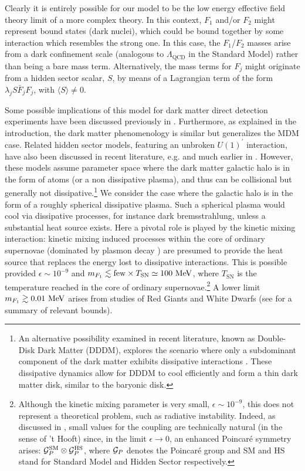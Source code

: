 \documentclass[12pt]{article}
\begin{document}
Clearly it is entirely possible for our model to be the low energy effective field theory limit of a more complex theory. In this context, $F _1$ and/or $F _2$ might represent bound states (dark nuclei), which could be bound together by some interaction which resembles the strong one. In this case, the $F_1$/$F_2$ masses arise from a dark confinement scale (analogous to $\Lambda _{\text{QCD}}$ in the Standard Model) rather than being a bare mass term. Alternatively, the mass terms for $F _j$ might originate from a hidden sector scalar, $S$, by means of a Lagrangian term of the form $\lambda _jS\bar{F} _jF _j$, with $\langle S \rangle \neq 0$.

Some possible implications of this model for dark matter direct detection experiments have been discussed previously in \cite{hiddensector}. Furthermore, as explained in the introduction, the dark matter phenomenology is similar but generalizes the MDM case. Related hidden sector models, featuring an unbroken $U(1) ^{'}$ interaction, have also been discussed in recent literature, e.g. \cite{feng,cline6,petrakiatomic} and much earlier in \cite{goldberghall}. However, these models assume parameter space where the dark matter galactic halo is in the form of atoms (or a non dissipative plasma), and thus can be collisional but generally not dissipative.\footnote{An alternative possibility examined in recent literature, known as Double-Disk Dark Matter (DDDM), explores the scenario where only a subdominant component of the dark matter exhibits dissipative interactions \cite{dddm}. These dissipative dynamics allow for DDDM to cool efficiently and form a thin dark matter disk, similar to the baryonic disk.} We consider the case where the galactic halo is in the form of a roughly spherical dissipative plasma. Such a spherical plasma would cool via dissipative processes, for instance dark bremsstrahlung, unless a substantial heat source exists. Here a pivotal role is played by the kinetic mixing interaction: kinetic mixing induced processes within the core of ordinary supernovae (dominated by plasmon decay \cite{raf,updated}) are presumed to provide the heat source that replaces the energy lost to dissipative interactions. This is possible provided $\epsilon \sim 10 ^{-9}$ and $m _{F_1} \lesssim {\rm few} \times T _{\text{SN}} \simeq 100 \ {\rm MeV}$, where $T _{\text{SN}}$ is the temperature reached in the core of ordinary supernovae.\footnote{Although the kinetic mixing parameter is very small, $\epsilon \sim 10 ^{-9}$, this does not represent a theoretical problem, such as radiative instability. Indeed, as discussed in \cite{poincare}, small values for the coupling are technically natural (in the sense of 't Hooft) since, in the limit $\epsilon \rightarrow 0$, an enhanced Poincar\'e symmetry arises: ${\cal G} _P ^{\text{SM}} \otimes {\cal G} _P ^{\text{HS}}$, where ${\cal G} _P$ denotes the Poincar\'e group and SM and HS stand for Standard Model and Hidden Sector respectively.} A lower limit $m _{F_1} \gtrsim 0.01 \ {\rm MeV}$ arises from studies of Red Giants \cite{redgiants} and White Dwarfs \cite{whitedwarfs,updated} (see \cite{bailey} for a summary of relevant bounds).
\end{document}
